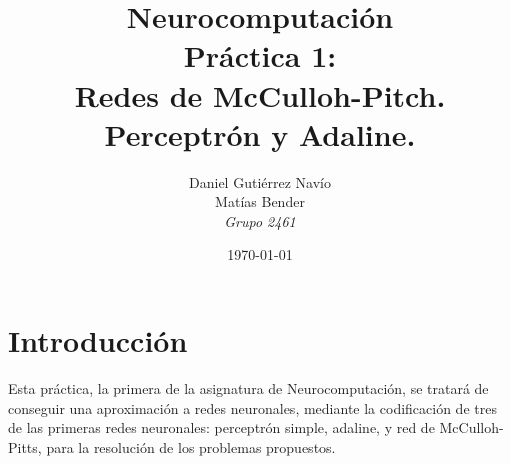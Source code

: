 \documentclass[12pt]{article}
\begin{document}
\title{
	{\bf Neurocomputación} \\
	Práctica 1:\\ {\bf Redes de McCulloh-Pitch. Perceptrón y Adaline}.\\
}
\author{
	Daniel Gutiérrez Navío \\
	Matías Bender \\
	\textit{Grupo 2461}
}
\date{\today}

\maketitle

\thispagestyle{empty}
\newpage


\tableofcontents
\listoffigures
\newpage


%

\setcounter{page}{1}

\setlength{\parindent}{0pt}

\setlength{\parskip}{8pt}


\newpage
\section*{Introducción}
Esta práctica, la primera de la asignatura de Neurocomputación, se tratará de conseguir una aproximación a redes neuronales, mediante la codificación de tres de las primeras redes neuronales: perceptrón simple, adaline, y red de McCulloh-Pitts, para la resolución de los problemas propuestos.
\end{document}
